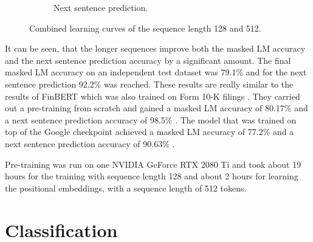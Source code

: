 \begin{figure}[h]
\begin{subfigure}{0.5\textwidth}
        \caption{Next sentence prediction.}
        \label{figure:bert_pretraining_learning_512_nsp}
    \end{subfigure}
    \caption{Combined learning curves of the sequence length 128 and 512.}
    \label{figure:bert_pretraining_learning_512}
\end{figure}
It can be seen, that the longer sequences improve both the masked LM accuracy and the next sentence prediction accuracy by a significant amount.
The final masked LM accuracy on an independent test dataset was 79.1\% and for the next sentence prediction 92.2\% was reached.
These results are really similar to the results of FinBERT which was also trained on Form 10-K filings \cite[p. 4]{DeSola2019}.
They carried out a pre-training from scratch and gained a masked LM accuracy of 80.17\% and a next sentence prediction accuracy of 98.5\% \cite[p. 7]{DeSola2019}.
The model that was trained on top of the Google checkpoint achieved a masked LM accuracy of 77.2\% and a next sentence prediction accuracy of 90.63\% \cite[p. 7]{DeSola2019}.

Pre-training was run on one NVIDIA GeForce RTX 2080 Ti and took about 19 hours for the training with sequence length 128 and about 2 hours for learning the positional embeddings, with a sequence length of 512 tokens.

\section{Classification}
\label{sec:report_classification}

